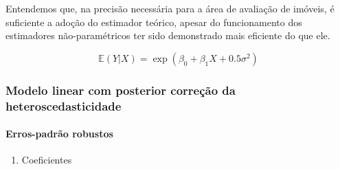 \documentclass[a4paper]{article}
\providecommand{\tightlist}{%
  \setlength{\itemsep}{0pt}\setlength{\parskip}{0pt}}
\let\oldparagraph\paragraph
\renewcommand{\paragraph}[1]{\oldparagraph{#1}\mbox{}}
\begin{document}
Entendemos que, na precisão necessária para a área de avaliação de
imóveis, é suficiente a adoção do estimador teórico, apesar do
funcionamento dos estimadores não-paramétricos ter sido demonstrado mais
eficiente do que ele.

\[\mathbb{E}(Y|X) = \exp(\beta_0 + \beta_1X + 0.5\sigma^2)\]

\subsubsection{Modelo linear com posterior correção da
heteroscedasticidade}\label{modelo-linear-com-posterior-correcao-da-heteroscedasticidade}

\paragraph{Erros-padrão robustos}\label{erros-padrao-robustos}

\begin{enumerate}
\def\labelenumi{\alph{enumi}.}
\tightlist
\item
  Coeficientes
\end{enumerate}
\end{document}
